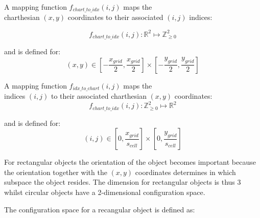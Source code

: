 A mapping function $f_\mathit{chart\_to\_idx}(i,j)$ maps the\\charthesian $(x,y)$ coordinates to their associated $(i,j)$ indices:

\[f_\mathit{chart\_to\_idx}(i,j): \mathbb{R}^2 \mapsto \mathbb{Z}_{\geq 0}^2 \]

and is defined for: 
\[ \mathit{(x, y)} \in [-\frac{\mathit{x_{\mathit{grid}}}}{2}, \frac{\mathit{x_{\mathit{grid}}}}{2}] \times [-\frac{y_{\mathit{grid}}}{2}, \frac{y_{\mathit{grid}}}{2}]\]

A mapping function $f_\mathit{idx\_to\_chart}(i, j)$ maps the\\indices $(i, j)$ to their associated charthesian $(x,y)$ coordinates:
\[f_\mathit{chart\_to\_idx}(i,j): \mathbb{Z}_{\geq 0}^2  \mapsto \mathbb{R}^2 \]

and is defined for:
\[ \mathit{(i, j)} \in [0, \frac{x_{\mathit{grid}}}{s_{\mathit{cell}}}] \times [0, \frac{y_{\mathit{grid}}}{s_{\mathit{cell}}}]\]


For rectangular objects the orientation of the object becomes important because the orientation together with the $\mathit{(x, y)}$ coordinates determines in which subspace the object resides. The dimension for rectangular objects is thus 3 whilst circular objects have a 2-dimensional configuration space.\bs

The configuration space for a recangular object is defined as:\bs

